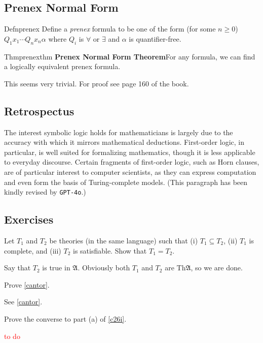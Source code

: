\subsection*{Prenex Normal Form}

\begin{reference}{Defn}{prenex}
  Define a \textit{prenex} formula to be one of the form (for some $n\geq0$) $Q_1x_1\cdots Q_nx_n \alpha$ where $Q_i$ is $\forall$ or $\exists$ and $\alpha$ is quantifier-free.
\end{reference}

\begin{reference}{Thm}{prenexthm}
  \textbf{Prenex Normal Form Theorem}\quad For any formula, we can find a logically equivalent prenex formula.
\end{reference}

This seems very trivial. For proof see page 160 of the book.

\subsection*{Retrospectus}

The interest symbolic logic holds for mathematicians is largely due to the accuracy with which it mirrors mathematical deductions. First-order logic, in particular, is well suited for formalizing mathematics, though it is less applicable to everyday discourse. Certain fragments of first-order logic, such as Horn clauses, are of particular interest to computer scientists, as they can express computation and even form the basis of Turing-complete models. (This paragraph has been kindly revised by \texttt{GPT-4o}.)

\subsection*{Exercises}

\setcounter{exercise}{1}

\begin{exercise}
  Let $T_1$ and $T_2$ be theories (in the same language) such that (i) $T_1\subseteq T_2$, (ii) $T_1$ is complete, and (iii) $T_2$ is satisfiable. Show that $T_1=T_2$.
\end{exercise}

Say that $T_2$ is true in $\mathfrak{A}$. Obviously both $T_1$ and $T_2$ are $\mathrm{Th}\mathfrak{A}$, so we are done.

\setcounter{exercise}{3}

\begin{exercise}
  Prove \ref{cantor}.
\end{exercise}

See \ref{cantor}.

\setcounter{exercise}{5}

\begin{exercise}
  Prove the converse to part (a) of \ref{c26i}.
\end{exercise}

\textcolor{red}{to do}

